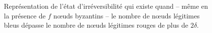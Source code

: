 \documentclass[letterpaper,twocolumn,10pt]{article}
\theoremstyle{definition}
\begin{document}
\begin{figure}[h]
\begin{center}

\caption{Représentation de l'état d'irréversibilité qui existe quand -- même en la présence de $f$ nœuds byzantins --
  le nombre de nœuds légitimes bleus dépasse le nombre de nœuds légitimes rouges de plus de $2\delta$.
}
\label{fig:states_feasible_solutions}
\end{center}
\end{figure}

\end{document}
